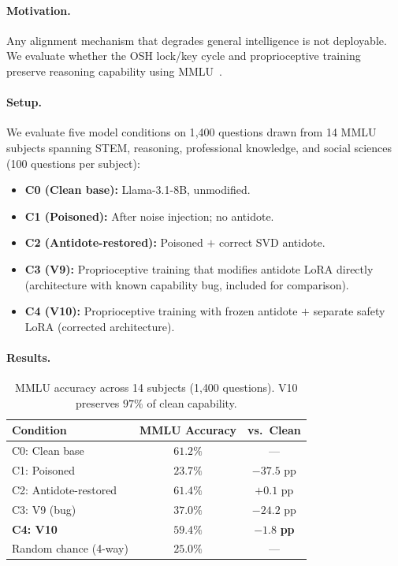 \documentclass[10pt,letterpaper]{article}
\begin{document}
\paragraph{Motivation.}
Any alignment mechanism that degrades general intelligence is not deployable.
We evaluate whether the OSH lock/key cycle and proprioceptive training preserve
reasoning capability using MMLU~\citep{hendrycks2020mmlu}.

\paragraph{Setup.}
We evaluate five model conditions on 1{,}400 questions drawn from 14 MMLU
subjects spanning STEM, reasoning, professional knowledge, and social sciences
(100 questions per subject):

\begin{itemize}
    \item \textbf{C0 (Clean base):} Llama-3.1-8B, unmodified.
    \item \textbf{C1 (Poisoned):} After noise injection; no antidote.
    \item \textbf{C2 (Antidote-restored):} Poisoned $+$ correct SVD antidote.
    \item \textbf{C3 (V9):} Proprioceptive training that modifies antidote LoRA
          directly (architecture with known capability bug, included for comparison).
    \item \textbf{C4 (V10):} Proprioceptive training with frozen antidote $+$
          separate safety LoRA (corrected architecture).
\end{itemize}

\paragraph{Results.}

\begin{table}[h]
\centering
\caption{MMLU accuracy across 14 subjects (1{,}400 questions). V10 preserves
         $97\%$ of clean capability.}
\label{tab:mmlu}
\begin{tabular}{lcc}
\toprule
\textbf{Condition} & \textbf{MMLU Accuracy} & \textbf{vs.\ Clean} \\
\midrule
C0: Clean base          & $61.2\%$ & --- \\
C1: Poisoned            & $23.7\%$ & $-37.5$ pp \\
C2: Antidote-restored   & $61.4\%$ & $+0.1$ pp \\
C3: V9 (bug)            & $37.0\%$ & $-24.2$ pp \\
\textbf{C4: V10}        & $\mathbf{59.4\%}$ & $\mathbf{-1.8}$ \textbf{pp} \\
\midrule
Random chance (4-way)   & $25.0\%$ & --- \\
\bottomrule
\end{tabular}
\end{table}
\end{document}
